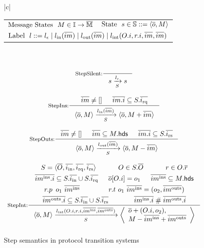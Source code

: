 \begin{figure}[t]
  \centering
  \begin{tabular}{|c|}
    \hline
     \\
    \begin{tabular}{lr}
      $\textrm{Message States}\ \ M \in \mathbb{I}{} \to \overline{\mathbb{M}}$ &
      $\textrm{State}\ \ s \in \mathbb{S}{} ::= \langle \overline{o}, M \rangle$ \\
      \multicolumn{2}{l}{$\textrm{Label}\ \ l ::= l_\epsilon{}\; |\; l_{\textrm{in}}(\overline{im})\; |\; l_{\textrm{out}}(\overline{im})\; |\; l_{\textrm{int}}(O.i, r.i, \overline{im}, \overline{im})$} \\
    \end{tabular}\\
     \\
    \begin{math}
      \begin{array}{c}
        \inference[StepSilent:]{}{\semstep{S}{s}{\lblEmpty{}}{s}}\bigskip\\
        \inference[StepIns:]{\listof{im} \neq \listnil
          & \listof{\idxOf{im}} \subseteq \hsysRqA{S}}{\semstep{S}
          {\hst{\listof{o}}{M}}
          {\lblIns{\listof{im}}}
          {\hst{\listof{o}}{\enqMsgs{M}{\listof{im}}}}}\bigskip \\
        \inference[StepOuts:]{\listof{im} \neq \listnil
          & \listof{im} \subseteq \heads{M}
          & \listof{\idxOf{im}} \subseteq \hsysRsA{S}}{\semstep{S}
          {\hst{\listof{o}}{M}}
          {\lblOuts{\listof{im}}}
          {\hst{\listof{o}}{\deqMsgs{M}{\listof{im}}}}}\bigskip \\
        \inference[StepInt:]{S = \hsyss{\listof{O}}{i}
          & O \in S.\listof{O}
          & r \in O.\listof{r}\smallskip \\
          \midxIns{im} \subseteq \hsysInA{S} \cup \hsysRqA{S}
          & \listof{o}[\idxOf{O}] = o_1
          & \msgIns{im} \subseteq \heads{M}\smallskip \\
          r.p\enspace o_1\ \msgIns{im}
          & r.t\ o_1\ \msgIns{im} = (o_2, \msgOuts{im})\smallskip \\
          \midxOuts{im} \subseteq \hsysInA{S} \cup \hsysRsA{S}
          & \disj{\midxIns{im}}{\midxOuts{im}}}{\semstep{S}
          {\hst{\listof{o}}{M}}
          {\lblInt{\idxOf{O}}{\idxOf{r}}{\msgIns{im}}{\msgOuts{im}}}
          {\hstm{\mapupd{\listof{o}}{\idxOf{O}}{o_2}}{\enqMsgs{\deqMsgs{M}{\msgIns{im}}}{\msgOuts{im}}}}}\medskip \\
      \end{array}
    \end{math}\\
    \hline
  \end{tabular}
  \caption{Step semantics in protocol transition systems}
  \label{fig-trs-semantics-steps}
\end{figure}

